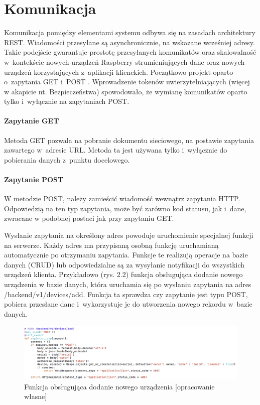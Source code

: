 \documentclass[polish,bachelor,a4paper,oneside]{ppfcmthesis}
\begin{document}
    \section{Komunikacja}

    Komunikacja pomiędzy elementami systemu odbywa się na zasadach architektury REST. Wiadomości przesyłane są asynchronicznie, na wskazane wcześniej adresy.
    Takie podejście gwarantuje prostotę przesyłanych komunikatów oraz skalowalność w~kontekście nowych urządzeń Raspberry strumieniujących dane oraz nowych urządzeń korzystających z~aplikacji klienckich. Początkowo projekt oparto o~zapytania GET i~POST \cite{WEBARCH}. Wprowadzenie tokenów uwierzytelniających (więcej w akapicie nt. Bezpieczeństwa) spowodowało, że wymianę komunikatów oparto tylko i~wyłącznie na zapytaniach POST.

    \paragraph{Zapytanie GET}
    Metoda GET pozwala na pobranie dokumentu sieciowego, na postawie zapytania zawartego w~adresie URL. Metoda ta jest używana tylko i~wyłącznie do pobierania danych z~punktu docelowego.

    \paragraph{Zapytanie POST}
    W metodzie POST, należy zamieścić wiadomość wewnątrz zapytania HTTP. Odpowiedzią na ten typ zapytania, może być zarówno kod statusu, jak i~dane, zwracane w podobnej postaci jak przy zapytaniu GET.

    Wysłanie zapytania na określony adres powoduje uruchomienie specjalnej funkcji na serwerze. Każdy adres ma przypisaną osobną funkcję uruchamianą automatycznie po otrzymaniu zapytania. Funkcje te realizują operacje na bazie danych (CRUD) lub odpowiedzialne są za wysyłanie notyfikacji do wszystkich urządzeń klienta. Przykładowo (rys. 2.2) funkcja obsługująca dodanie nowego urządzenia w bazie danych, która uruchamia się po wysłaniu zapytania na adres /backend/v1/devices/add. Funkcja ta sprawdza czy zapytanie jest typu POST, pobiera przesłane dane i~wykorzystuje je do utworzenia nowego rekordu w~bazie danych.
    \begin{figure}[ht]
        \centering
        \includegraphics[width=14cm]{backend.png}
        \caption{Funkcja obsługująca dodanie nowego urządzenia [opracowanie własne]}
    \end{figure}
\end{document}
